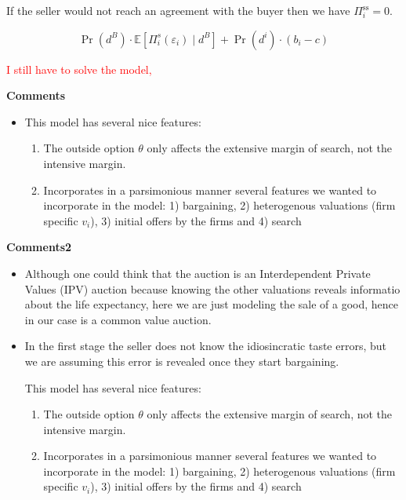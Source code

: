 \documentclass[12pt]{article}
\theoremstyle{plain}
\theoremstyle{plain}
\begin{document}
If the seller would not reach an agreement with the buyer then we have $\Pi^{\text{ss}}_i=0$. 

\[
\Pr(d^B) \cdot \mathbb{E} \left[ \Pi^s_i(\varepsilon_i) \mid d^B \right]
+ \Pr(d^i) \cdot (b_i - c)
\]

\textcolor{red}{I still have to solve the model, }


\textbf{Comments} 
\begin{itemize}

    \item This model has several nice features: 
    \begin{enumerate}
        \item The outside option $\theta$ only affects the extensive margin of search, not the intensive margin. 
        \item Incorporates in a parsimonious manner several features we wanted to incorporate in the model: 1) bargaining, 2) heterogenous valuations (firm specific $v_i$), 3) initial offers by the firms and 4) search  
    \end{enumerate}
\end{itemize}



\textbf{Comments2} 
\begin{itemize}

    \item Although one could think that the auction is an Interdependent Private Values (IPV) auction because knowing the other valuations reveals informatio about the life expectancy, here we are just modeling the sale of a good, hence in our case is a common value auction. 
    
    \item In the first stage the seller does not know the idiosincratic taste errors, but we are assuming this error is revealed once they start bargaining.  
    
    
    This model has several nice features: 
    \begin{enumerate}
        \item The outside option $\theta$ only affects the extensive margin of search, not the intensive margin. 
        \item Incorporates in a parsimonious manner several features we wanted to incorporate in the model: 1) bargaining, 2) heterogenous valuations (firm specific $v_i$), 3) initial offers by the firms and 4) search  
    \end{enumerate}
\end{itemize}
\end{document}
